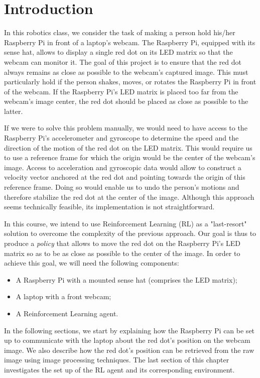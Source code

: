 \chapter{Introduction}

In this robotics class, we consider the task of making a person hold his/her Raspberry Pi in front of a laptop's webcam.  The Raspberry Pi, equipped with its sense hat,  allows to display a single red dot on its LED matrix so that the webcam can monitor it. The goal of this project is to ensure that the red dot always remains as close as possible to the webcam's captured image. This must particularly hold if the person shakes, moves, or rotates the Raspberry Pi in front of the webcam. If the Raspberry Pi's LED matrix is placed too far from the webcam's image center, the red dot should be placed as close as possible to the latter.

If we were to solve this problem manually, we would need to have access to the Raspberry Pi's accelerometer and gyroscope to determine the speed and the direction of the motion of the red dot on the LED matrix. This would require us to use a reference frame for which the origin would be the center of the webcam's image. Access to acceleration and gyroscopic data would allow to construct a velocity vector anchored at the red dot and pointing towards the origin of this reference frame. Doing so would enable us to undo the person's motions and therefore stabilize the red dot at the center of the image. Although this approach seems technically feasible, its implementation is not straightforward. 

In this course, we intend to use Reinforcement Learning (RL) as a "last-resort" solution to overcome the complexity of the previous approach. Our goal is thus to produce a \textit{policy} that allows to move the red dot on the Raspberry Pi's LED matrix so as to be as close as possible to the center of the image. In order to achieve this goal, we will need the following components:

\begin{itemize}
	\item A Raspberry Pi with a mounted sense hat (comprises the LED matrix);
	\item A laptop with a front webcam;
	\item A Reinforcement Learning agent.
\end{itemize}

In the following sections, we start by explaining how the Raspberry Pi can be set up to communicate with the laptop about the red dot's position on the webcam image.  We also describe how the red dot's position can be retrieved from the raw image using image processing techniques. The last section of this chapter investigates the set up of the RL agent and its corresponding environment.

